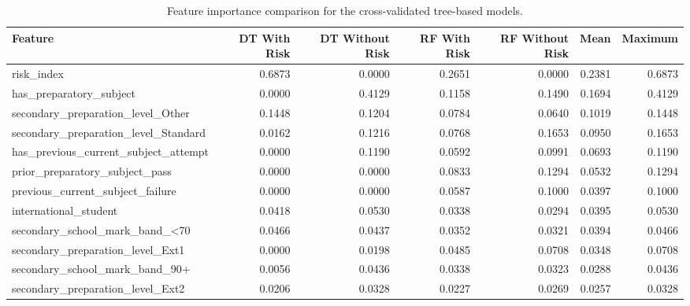 \begin{table}[htbp]
\caption{Feature importance comparison for the cross-validated tree-based models.}
\label{tab:tuned_feature_importance}
\begin{tabular}{lrrrrrr}
\toprule
Feature & DT With Risk & DT Without Risk & RF With Risk & RF Without Risk & Mean & Maximum \\
\midrule
risk\_index & 0.6873 & 0.0000 & 0.2651 & 0.0000 & 0.2381 & 0.6873 \\
has\_preparatory\_subject & 0.0000 & 0.4129 & 0.1158 & 0.1490 & 0.1694 & 0.4129 \\
secondary\_preparation\_level\_Other & 0.1448 & 0.1204 & 0.0784 & 0.0640 & 0.1019 & 0.1448 \\
secondary\_preparation\_level\_Standard & 0.0162 & 0.1216 & 0.0768 & 0.1653 & 0.0950 & 0.1653 \\
has\_previous\_current\_subject\_attempt & 0.0000 & 0.1190 & 0.0592 & 0.0991 & 0.0693 & 0.1190 \\
prior\_preparatory\_subject\_pass & 0.0000 & 0.0000 & 0.0833 & 0.1294 & 0.0532 & 0.1294 \\
previous\_current\_subject\_failure & 0.0000 & 0.0000 & 0.0587 & 0.1000 & 0.0397 & 0.1000 \\
international\_student & 0.0418 & 0.0530 & 0.0338 & 0.0294 & 0.0395 & 0.0530 \\
secondary\_school\_mark\_band\_<70 & 0.0466 & 0.0437 & 0.0352 & 0.0321 & 0.0394 & 0.0466 \\
secondary\_preparation\_level\_Ext1 & 0.0000 & 0.0198 & 0.0485 & 0.0708 & 0.0348 & 0.0708 \\
secondary\_school\_mark\_band\_90+ & 0.0056 & 0.0436 & 0.0338 & 0.0323 & 0.0288 & 0.0436 \\
secondary\_preparation\_level\_Ext2 & 0.0206 & 0.0328 & 0.0227 & 0.0269 & 0.0257 & 0.0328 \\
\bottomrule
\end{tabular}
\end{table}
